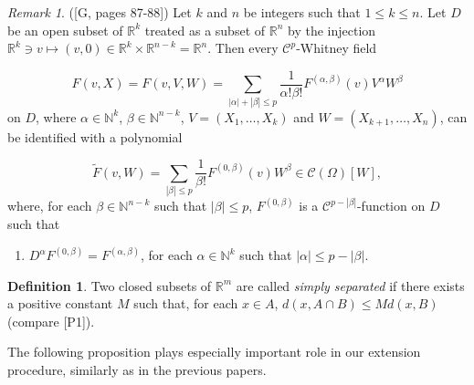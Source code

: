 \documentclass[12pt]{amsart}
\theoremstyle{definition}
\newtheorem{defn}[thm]{Definition}
\theoremstyle{remark}
\newtheorem{rem}[thm]{Remark}
\numberwithin{equation}{section}
\newcommand{\Real}{\mathbb R}
\begin{document}
\bigskip
\begin{rem} ([G, pages 87-88]) Let $k$ and $n$ be integers such that $1\leq k\leq n$. Let $D$ be an open subset of $\Real^k$ treated as a subset of $\Real^n$ by the injection $\Real^k\ni v\longmapsto (v, 0)\in \Real^k\times \Real^{n-k}=\Real^n$. Then every $\mathcal{C}^p$-Whitney field

$$
F(v, X) = F(v, V, W) = \sum_{|\alpha| + |\beta|\leq p}\frac{1}{\alpha!\beta!}F^{(\alpha,\beta)}(v)V^\alpha W^\beta
$$
on $D$, where $\alpha\in \mathbb{N}^k$, $\beta\in \mathbb{N}^{n-k}$, $V = (X_1,\dots,X_k)$ and $W = (X_{k+1},\dots,X_n)$, can be identified with a polynomial

$$
\tilde{F}(v, W)= \sum_{|\beta|\leq p}\frac{1}{\beta!}F^{(0,\beta)}(v)W^\beta\in \mathcal{C}(\varOmega)[W],
$$
where, for each $\beta\in \mathbb{N}^{n-k}$ such that $|\beta|\leq p$, $F^{(0,\beta)}$ is a $\mathcal{C}^{p-|\beta|}$-function on $D$ such that

\begin{enumerate}
\item[($\ast\ast$)]{\qquad ${D^{\alpha}}F^{(0,\beta)} = F^{(\alpha,\beta)}$, \quad for each $\alpha\in \mathbb{N}^k$ such that $|\alpha|\leq p - |\beta|$.}
\end{enumerate}
\end{rem}

\medskip
\begin{defn}
Two closed subsets of $\Real^m$ are called \emph{simply separated} if there exists a positive constant $M$ such that, for each $x\in A$, $d(x, A\cap B)\leq Md(x, B)$ (compare [P1]).
\end{defn}

\bigskip
The following proposition plays especially important role in our extension procedure, similarly as in the previous papers.
\end{document}
